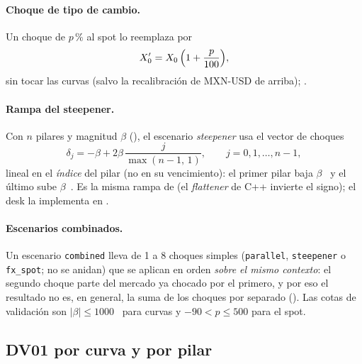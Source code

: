 \paragraph{Choque de tipo de cambio.} Un choque de $p\,\%$ al spot lo reemplaza por
\begin{equation}\label{eq:cap09-spot}
  X_0'=X_0\,\Bigl(1+\frac{p}{100}\Bigr),
\end{equation}
sin tocar las curvas (salvo la recalibración de MXN-USD de arriba); .

\paragraph{Rampa del steepener.} Con $n$ pilares y magnitud $\beta$ (\pb), el escenario \emph{steepener} usa el vector de choques
\begin{equation}\label{eq:cap09-rampa}
  \delta_j=-\beta+2\beta\,\frac{j}{\max(n-1,\,1)},\qquad j=0,1,\dots,n-1,
\end{equation}
lineal en el \emph{índice} del pilar (no en su vencimiento): el primer pilar baja $\beta$~\pb{} y el último sube $\beta$~\pb. Es la misma rampa de  (el \emph{flattener} de C++ invierte el signo); el desk la implementa en .

\paragraph{Escenarios combinados.} Un escenario \texttt{combined} lleva de 1 a 8 choques simples (\texttt{parallel}, \texttt{steepener} o \texttt{fx\_spot}; no se anidan) que se aplican en orden \emph{sobre el mismo contexto}: el segundo choque parte del mercado ya chocado por el primero, y por eso el resultado no es, en general, la suma de los choques por separado (). Las cotas de validación son $|\beta|\le 1000$~\pb{} para curvas y $-90<p\le 500$ para el spot.

\subsection{DV01 por curva y por pilar}\label{sec:cap09-dv01}

